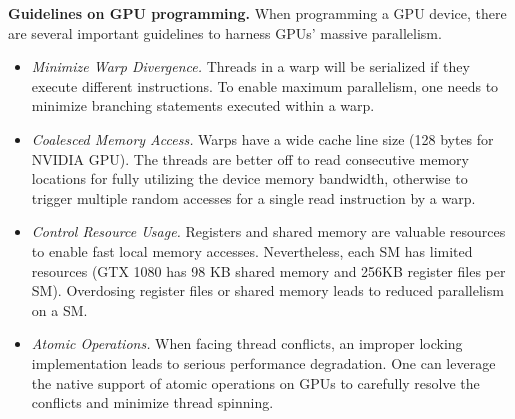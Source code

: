 \vspace{1mm}\noindent\textbf{Guidelines on GPU programming.}
When programming a GPU device, there are several important guidelines to harness GPUs' massive parallelism.
\begin{itemize}
	\item \emph{Minimize Warp Divergence.} Threads in a warp will be serialized if they execute different instructions. To enable maximum parallelism, one needs to minimize branching statements executed within a warp.  
	\item \emph{Coalesced Memory Access.} Warps have a wide cache line size (128 bytes for NVIDIA GPU). The threads are better off to read consecutive memory locations for fully utilizing the device memory bandwidth, otherwise to trigger multiple random accesses for a single read instruction by a warp. 
	\item \emph{Control Resource Usage.} Registers and shared memory are valuable resources to enable fast local memory accesses. Nevertheless, each SM has limited resources (GTX 1080 has 98 KB shared memory and 256KB register files per SM). Overdosing register files or shared memory leads to reduced parallelism on a SM.  
	\item \emph{Atomic Operations.} When facing thread conflicts, an improper locking implementation leads to serious performance degradation. One can leverage the native support of atomic operations \cite{sanders2010cuda} on GPUs to carefully resolve the conflicts and minimize thread spinning.
\end{itemize}